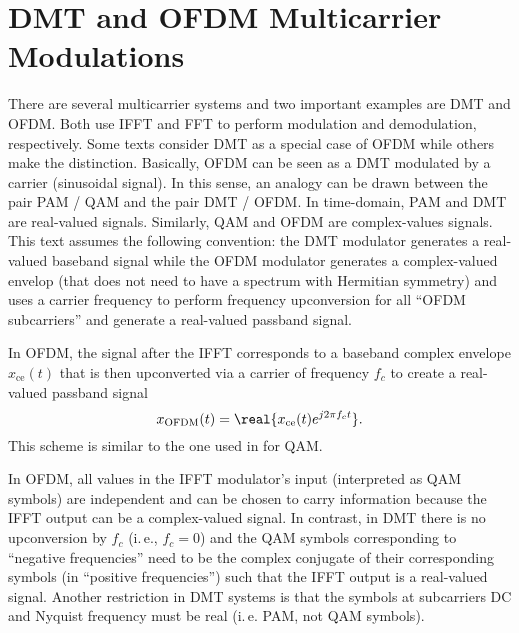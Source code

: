 

\section{DMT and OFDM Multicarrier Modulations}

There are several multicarrier systems and two important examples are DMT and OFDM. Both use IFFT and FFT to perform modulation and demodulation, respectively. Some texts consider DMT as a special case of OFDM while others make the distinction. Basically, OFDM can be seen as a DMT modulated by a carrier (sinusoidal signal). In this sense, an analogy can be drawn between the pair PAM / QAM and the pair DMT / OFDM. In time-domain, PAM and DMT are real-valued signals. Similarly, QAM and OFDM are complex-values signals. This text assumes the following convention: the DMT modulator generates a real-valued baseband signal while the OFDM modulator generates a complex-valued envelop (that does not need to have a spectrum with Hermitian symmetry) and uses a carrier frequency to perform frequency upconversion for all ``OFDM subcarriers'' and generate a real-valued passband signal. 

In OFDM, the signal after the IFFT corresponds to a baseband complex envelope $x_{\textrm{ce}}(t)$ that is then upconverted via a carrier of frequency $f_c$ to create a real-valued passband signal 
\begin{equation}
x_{\textrm{OFDM}}(t) = \real{ x_\textrm{ce}(t) e^{j 2 \pi f_c t} }.
\label{eq:ofdm}
\end{equation}
This scheme is similar to the one used in  for QAM.

In OFDM, all values in the IFFT modulator's input (interpreted as QAM symbols) are independent and can be chosen to carry information because the IFFT output can be a complex-valued signal. In contrast, in DMT there is no upconversion by $f_c$ (i.\,e., $f_c = 0$) and the QAM symbols corresponding to ``negative frequencies'' need to be the complex conjugate of their corresponding symbols (in ``positive frequencies'') such that the IFFT output is a real-valued signal. Another restriction in DMT systems is that the symbols at subcarriers DC and Nyquist frequency must be real (i.\,e. PAM, not QAM symbols). 

